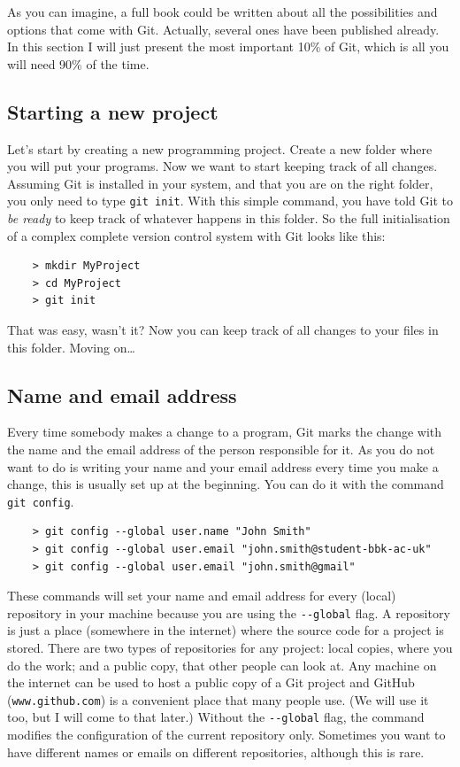 As you can imagine, a full book could be written about all the
possibilities and options that come with Git. Actually, several ones
have been published already. In this section I will just present the
most important 10\% of Git, which is all 
you will need 90\% of the time.  

\subsection{Starting a new project}
\label{sec:starting-new-project}

Let's start by creating a new programming project. Create a new folder
where you will put your programs. Now we want to start keeping track
of all changes. Assuming Git is installed in your system, and that you
are on the right folder, you only need to type \verb+git init+. With
this simple command, you have told Git to \emph{be ready} to keep 
track of whatever happens in this folder. So the full initialisation
of a complex complete version control system with Git looks like this: 

\begin{verbatim}
    > mkdir MyProject
    > cd MyProject
    > git init
\end{verbatim}

That was easy, wasn't it? Now you can keep track of all changes to
your files in this folder. Moving on\ldots

\subsection{Name and email address}
\label{sec:name-email-address}

Every time somebody makes a change to a program, Git marks the change
with the name and the email address of the person responsible for it. 
As you do not want to do is writing your
name and your email address every time you make a change, this is
usually set up at the beginning. You can do it with the command 
\verb+git config+. 

\begin{verbatim}
    > git config --global user.name "John Smith"
    > git config --global user.email "john.smith@student-bbk-ac-uk"
    > git config --global user.email "john.smith@gmail"
\end{verbatim}

These commands will set your name and email address for every (local)
repository in your machine because you are using the \verb+--global+
flag. 
%
A repository is just a place (somewhere in the internet) where the
source code for a project is stored. There are two types of 
repositories for any project:
local copies, where you do the work; and a public copy, that other
people can look at. 
Any machine on the internet can
be used to host a public copy of a Git project
and GitHub (\verb+www.github.com+) 
is a convenient place that
many people use. (We will use it too, but I will come to that later.)
%
Without the \verb+--global+ flag, 
the command modifies the configuration of
the current repository only. 
Sometimes you want to have different names or
emails on different repositories, although this is rare. 

